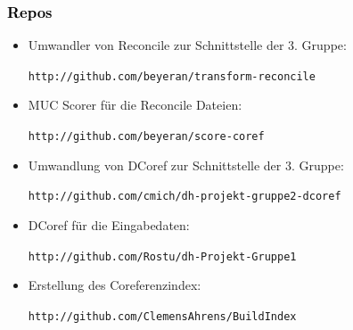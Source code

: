 \documentclass[xcolor=dvipsnames]{beamer}
\begin{document}
\begin{frame}[plain]
\frametitle{\textcolor{black}{Repos}}

\begin{itemize}
  \item Umwandler von Reconcile zur Schnittstelle der 3. Gruppe:\par \texttt{http://github.com/beyeran/transform-reconcile}\vspace{0.3cm}
  \item MUC Scorer für die Reconcile Dateien:\par \texttt{http://github.com/beyeran/score-coref}\vspace{0.3cm}
  \item Umwandlung von DCoref zur Schnittstelle der 3. Gruppe:\par \texttt{http://github.com/cmich/dh-projekt-gruppe2-dcoref}\vspace{0.3cm}
  \item DCoref für die Eingabedaten:\par \texttt{http://github.com/Rostu/dh-Projekt-Gruppe1}\vspace{0.3cm}
  \item Erstellung des Coreferenzindex: \par \texttt{http://github.com/ClemensAhrens/BuildIndex}\vspace{0.3cm}
\end{itemize}

\end{frame}
\end{document}
